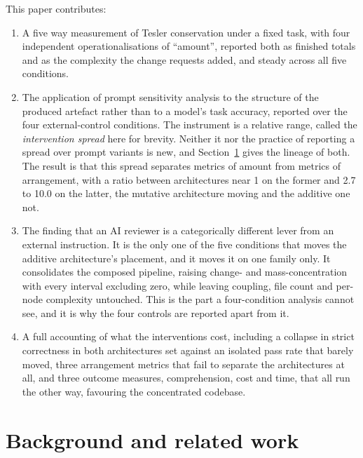 \documentclass[11pt,a4paper]{article}
\begin{document}
This paper contributes:

\begin{enumerate}
\item A five way measurement of Tesler conservation under a fixed task, with
  four independent operationalisations of ``amount'', reported both as finished
  totals and as the complexity the change requests added, and steady across all
  five conditions.
\item The application of prompt sensitivity analysis to the structure of the
  produced artefact rather than to a model's task accuracy, reported over the
  four external-control conditions. The instrument is a relative range, called
  the \emph{intervention spread} here for brevity. Neither it nor the practice
  of reporting a spread over prompt variants is new, and Section~\ref{sec:related}
  gives the lineage of both. The result is that this spread separates metrics of
  amount from metrics of arrangement, with a ratio between architectures near 1
  on the former and 2.7 to 10.0 on the latter, the mutative architecture moving
  and the additive one not.
\item The finding that an AI reviewer is a categorically different lever from an
  external instruction. It is the only one of the five conditions that moves the
  additive architecture's placement, and it moves it on one family only. It
  consolidates the composed pipeline, raising change- and mass-concentration with
  every interval excluding zero, while leaving coupling, file count and per-node
  complexity untouched. This is the part a four-condition analysis cannot see,
  and it is why the four controls are reported apart from it.
\item A full accounting of what the interventions cost, including a collapse in
  strict correctness in both architectures set against an isolated pass rate that
  barely moved, three arrangement metrics that fail to separate the architectures
  at all, and three outcome measures, comprehension, cost and time, that all run
  the other way, favouring the concentrated codebase.
\end{enumerate}

\section{Background and related work}
\label{sec:related}
\end{document}
